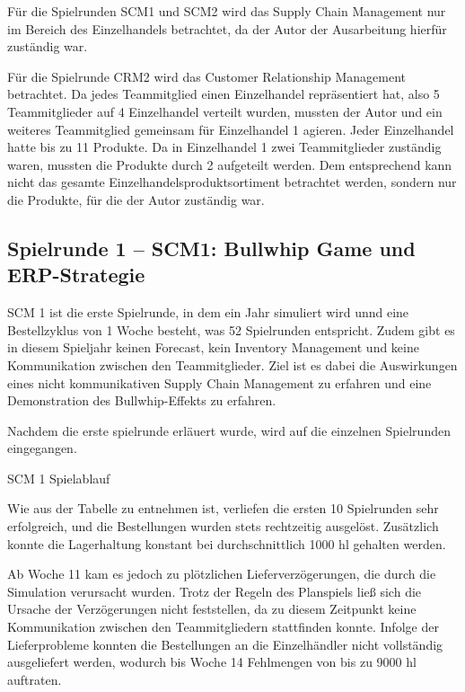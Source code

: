 \documentclass[a4paper,12pt]{article}
\begin{document}
Für die Spielrunden SCM1 und SCM2 wird das Supply Chain Management nur im Bereich des Einzelhandels betrachtet,
da der Autor der Ausarbeitung hierfür zuständig war.

Für die Spielrunde CRM2 wird das Customer Relationship Management betrachtet. Da jedes Teammitglied einen Einzelhandel repräsentiert hat, also 5 Teammitglieder auf 4 Einzelhandel verteilt wurden,
mussten der Autor und ein weiteres Teammitglied gemeinsam für Einzelhandel 1 agieren. Jeder Einzelhandel hatte bis zu 11 Produkte. Da in Einzelhandel 1 zwei Teammitglieder zuständig waren, mussten die Produkte durch 2 aufgeteilt werden.
Dem entsprechend kann nicht das gesamte Einzelhandelsproduktsortiment betrachtet werden, sondern nur die Produkte, für die der Autor zuständig war.

\subsection{Spielrunde 1 – SCM1: Bullwhip Game und ERP-Strategie}
SCM 1 ist die erste Spielrunde, in dem ein Jahr simuliert wird unnd eine Bestellzyklus von 1 Woche besteht, was 52 Spielrunden entspricht.
Zudem gibt es in diesem Spieljahr keinen Forecast, kein Inventory Management und keine Kommunikation zwischen den Teammitglieder.
Ziel ist es dabei die Auswirkungen eines nicht kommunikativen Supply Chain Management zu erfahren und eine Demonstration des Bullwhip-Effekts zu erfahren.\cite[Kapitel 9.6]{Gronwald2020}

Nachdem die  erste spielrunde erläuert wurde, wird auf die einzelnen Spielrunden eingegangen.
\begin{table}[H]
    \centering
    \caption{SCM 1 Spielablauf}
    \label{tab:SCM 1 Spielablauf}
\end{table}

Wie aus der Tabelle zu entnehmen ist, verliefen die ersten 10 Spielrunden sehr erfolgreich, und die Bestellungen wurden stets rechtzeitig ausgelöst.
Zusätzlich konnte die Lagerhaltung konstant bei durchschnittlich 1000 hl gehalten werden.

Ab Woche 11 kam es jedoch zu plötzlichen Lieferverzögerungen, die durch die Simulation verursacht wurden.
Trotz der Regeln des Planspiels ließ sich die Ursache der Verzögerungen nicht feststellen, da zu diesem Zeitpunkt keine Kommunikation zwischen den Teammitgliedern stattfinden konnte.
Infolge der Lieferprobleme konnten die Bestellungen an die Einzelhändler nicht vollständig ausgeliefert werden, wodurch bis Woche 14 Fehlmengen von bis zu 9000 hl auftraten.
\end{document}
